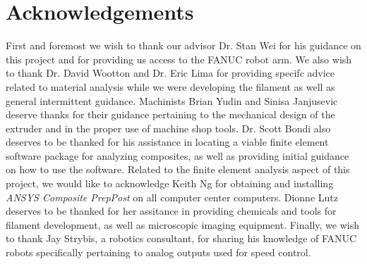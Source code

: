 \section{Acknowledgements}

\indent

First and foremost we wish to thank our advisor Dr. Stan Wei for his guidance on this project and for providing us access to the FANUC robot arm. We also wish to thank Dr. David Wootton and Dr. Eric Lima for providing specifc advice related to material analysis while we were developing the filament as well as general intermittent guidance. Machinists Brian Yudin and Sinisa Janjusevic deserve thanks for their guidance pertaining to the mechanical design of the extruder and in the proper use of machine shop tools. Dr. Scott Bondi also deserves to be thanked for his assistance in locating a viable finite element software package for analyzing composites, as well as providing initial guidance on how to use the software. Related to the finite element analysis aspect of this project, we would like to acknowledge Keith Ng for obtaining and installing \emph{ANSYS Composite PrepPost} on all computer center computers. Dionne Lutz deserves to be thanked for her assitance in providing chemicals and tools for filament development, as well as microscopic imaging equipment. Finally, we wish to thank Jay Strybis, a robotics consultant, for sharing his knowledge of FANUC robots specifically pertaining to analog outputs used for speed control.\\

